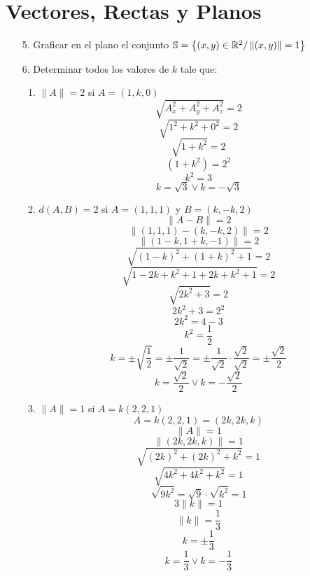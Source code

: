 \documentclass[../practica.root.tex]{subfiles}
\begin{document}
\setcounter{section}{0}
\section{Vectores, Rectas y Planos}

\begin{enumerate}
    \item[5.] Graficar en el plano el conjunto $ \mathbb{S} = \left\{ (x,y)\in\mathbb{R}^2 / \left\|(x,y)\right\| = 1 \right\} $
    
    \item[6.] Determinar todos los valores de $k$ tale que:
    \begin{enumerate}
        \item $ \| A \| = 2 $ si $ A = (1,k,0) $
        \[ \sqrt{A_x^2 + A_y^2 + A_z^2} = 2 \]
        \[ \sqrt{1^2 + k^2 + 0^2} = 2 \]
        \[ \sqrt{1 + k^2} = 2 \]
        \[ (1 + k^2) = 2^2 \]
        \[ k^2 = 3 \]
        \[ k = \sqrt{3} \lor k = -\sqrt{3} \]
        \item $ d(A,B) = 2 $ si $ A = (1,1,1) $ y $ B = (k,-k,2) $
        \[ \| A - B \| = 2 \]
        \[ \| (1,1,1) - (k,-k,2) \| = 2 \]
        \[ \| (1-k,1+k,-1) \| = 2 \]
        \[ \sqrt{(1-k)^2 + (1+k)^2 + 1} = 2 \]
        \[ \sqrt{1-2k+k^2 + 1+2k+k^2 + 1} = 2 \]
        \[ \sqrt{2k^2+3} = 2 \]
        \[ 2k^2+3 = 2^2 \]
        \[ 2k^2 = 4-3 \]
        \[ k^2 = \frac{1}{2} \]
        \[ k = \pm\sqrt{\frac{1}{2}} = \pm\frac{1}{\sqrt{2}} = \pm\frac{1}{\sqrt{2}}\cdot\frac{\sqrt{2}}{\sqrt{2}} = \pm\frac{\sqrt{2}}{2} \]
        \[ k = \frac{\sqrt{2}}{2} \lor k = -\frac{\sqrt{2}}{2} \]
        \item $ \| A \| = 1 $ si $ A = k(2,2,1) $
        \[ A = k(2,2,1) = (2k,2k,k) \]
        \[ \| A \| = 1 \]
        \[ \| (2k,2k,k) \| = 1 \]
        \[ \sqrt{(2k)^2 + (2k)^2 + k^2} = 1 \]
        \[ \sqrt{4k^2 + 4k^2 + k^2} = 1 \]
        \[ \sqrt{9k^2} = \sqrt{9}\cdot\sqrt{k^2} = 1 \]
        \[ 3\|k\| = 1 \]
        \[ \|k\| = \frac{1}{3} \]
        \[ k = \pm\frac{1}{3} \]
        \[ k = \frac{1}{3} \lor k = -\frac{1}{3} \]

\end{enumerate}
\end{enumerate}
\end{document}
